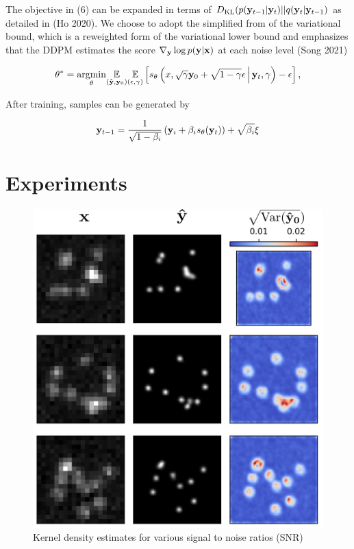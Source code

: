 \documentclass{article}
\begin{document}
The objective in (6) can be expanded in terms of $D_{\mathrm{KL}}(p(\bold{y}_{t-1}|\bold{y}_{t})|| q(\bold{y}_{t}|\bold{y}_{t-1})$ as detailed in (Ho 2020). We choose to adopt the simplified from of the variational bound, which is a reweighted form of the variational lower bound and emphasizes that the DDPM estimates the score $\nabla_{\bold{y}}\log p(\bold{y}|\bold{x})$ at each noise level (Song 2021)

\begin{equation}
\theta^{*} = \underset{\theta}{\mathrm{argmin}} \underset{(\bold{\hat{y}},\bold{y}_{0})}{\mathbb{E}}\underset{(\epsilon,\gamma)}{\mathbb{E}} \left[ s_{\theta}\left(x, \sqrt{\gamma} \bold{y}_0 + \sqrt{1 - \gamma} \epsilon \, \middle|\, \bold{y}_{t}, \gamma\right) - \epsilon \right],
\end{equation}

After training, samples can be generated by 

\begin{equation}
\bold{y}_{t-1} = \frac{1}{\sqrt{1-\beta_{i}}}\left(\bold{y}_{i} + \beta_{i}s_{\theta}(\bold{y}_{t})\right) + \sqrt{\beta_{i}}\bold{\xi}
\end{equation}


\section{Experiments}

\begin{figure}
\centering
\includegraphics[scale=0.8]{Samples.png}
\caption{Kernel density estimates for various signal to noise ratios (SNR)}
\end{figure}
\end{document}

